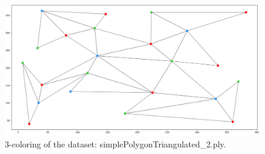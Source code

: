 \documentclass[english, fontsize=12pt, paper=a4, twoside=false, draft=true, pagesize=auto, version=last, DIV=16]{scrartcl}
\theoremstyle{break}
\begin{document}
\begin{figure}[h!]
\centering
\includegraphics[width=\textwidth]{images/Figure_2.png}
\caption{3-coloring of the dataset: simplePolygonTriangulated\_2.ply.}
\label{fig:task_1_b}
\end{figure}



% 
% 
	
\printbibliography
%
\end{document}
